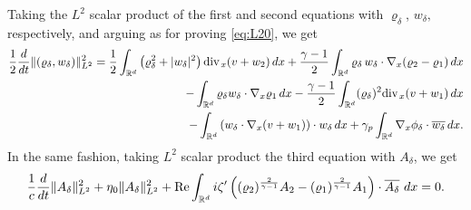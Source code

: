 \documentclass[11pt,twoside]{amsart}
\newcommand{\vr}{\varrho}
\newcommand\R{\mathbb{R}}
\renewcommand{\div}{\mbox{\rm div}\;\!}
\renewcommand{\Re}{\textnormal{Re}}
\begin{document}
Taking the $L^2$ scalar product of the first and second equations with $\vr_\delta$, $w_\delta,$ respectively,
and arguing as for proving  \eqref{eq:L20}, we get 
\begin{align}  \label{eq:uniq-1} 
\frac12 \frac{d}{dt}
\|(\vr_\delta,w_\delta)\|_{L^2}^2=\frac12\int_{\R^d}\left(\vr_\delta^2 + |w_\delta|^2\right)\div_x(v+w_2)\,dx
+\frac{\gamma-1}2
\int_{\R^d}\vr_\delta\,w_\delta\cdot\nabla_x (\varrho_2-\varrho_1)\,dx   \notag \\
-\int_{\R^d} \vr_\delta w_\delta\cdot\nabla_x\varrho_1 \, dx - \frac{\gamma-1}2\int_{\R^d}(\vr_\delta)^2\div_x(v+w_1)\,dx \notag \\
- \int_{\R^d}\left(w_\delta\cdot\nabla_x(v+w_1)\right)\cdot w_\delta \,dx +\gamma_p \int_{\R^d}\nabla_x \phi_\delta\cdot \overline{w_\delta} \, dx.
\end{align}
In the same fashion, taking $L^2$ scalar product the third equation with $A_\delta$, we get
%
\begin{align} 
\frac{1}{c}\frac d{dt}
\|A_\delta\|_{L^2}^2+\eta_0\| A_\delta\|_{L^2}^2 + \Re \int_{\R^d} i \zeta'\left((\varrho_2)^{\frac{2}{\gamma-1}} A_2-(\varrho_1)^{\frac{2}{\gamma-1}} A_1\right)\cdot \overline{A_\delta}\ dx=0.
\end{align} 
\end{document}
